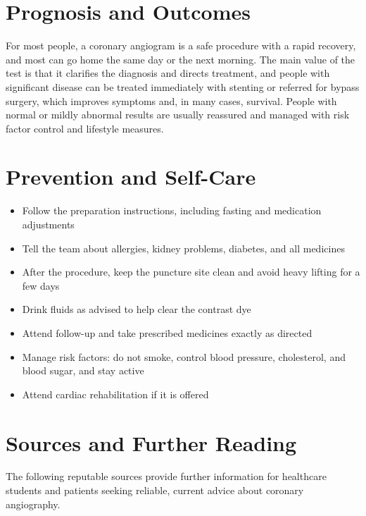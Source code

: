 \section*{Prognosis and Outcomes}
For most people, a coronary angiogram is a safe procedure with a rapid recovery, and most can go home the same day or the next morning. The main value of the test is that it clarifies the diagnosis and directs treatment, and people with significant disease can be treated immediately with stenting or referred for bypass surgery, which improves symptoms and, in many cases, survival. People with normal or mildly abnormal results are usually reassured and managed with risk factor control and lifestyle measures.

\section*{Prevention and Self-Care}
\begin{itemize}
    \item Follow the preparation instructions, including fasting and medication adjustments
    \item Tell the team about allergies, kidney problems, diabetes, and all medicines
    \item After the procedure, keep the puncture site clean and avoid heavy lifting for a few days
    \item Drink fluids as advised to help clear the contrast dye
    \item Attend follow-up and take prescribed medicines exactly as directed
    \item Manage risk factors: do not smoke, control blood pressure, cholesterol, and blood sugar, and stay active
    \item Attend cardiac rehabilitation if it is offered
\end{itemize}

\section*{Sources and Further Reading}
The following reputable sources provide further information for healthcare students and patients seeking reliable, current advice about coronary angiography.

